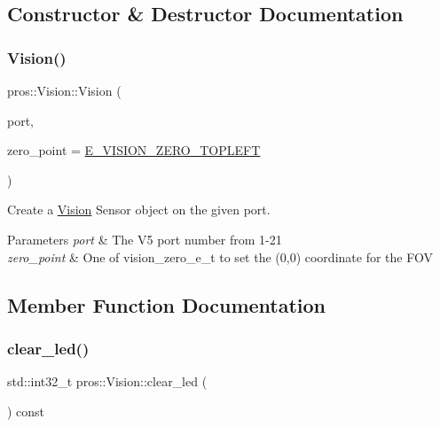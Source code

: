 \subsection{Constructor \& Destructor Documentation}
\mbox{\label{classpros_1_1Vision_a46cdaf74713f630b5bb5f4d0d3259dcd}} 
\subsubsection{\texorpdfstring{Vision()}{Vision()}}
{\footnotesize\ttfamily pros\+::\+Vision\+::\+Vision (\begin{DoxyParamCaption}\item[{std\+::uint8\+\_\+t}]{port,  }\item[{\mbox{\hyperlink{vision_8h_a2e8bc1c48f8aab12275bfc1868fbbad6}{vision\+\_\+zero\+\_\+e\+\_\+t}}}]{zero\+\_\+point = {\ttfamily \mbox{\hyperlink{vision_8h_aef7c8269b3fb0dfbf4e597b2d8dd7af5a0ff244c5f3e9771f962986e25b00ff3d}{E\+\_\+\+V\+I\+S\+I\+O\+N\+\_\+\+Z\+E\+R\+O\+\_\+\+T\+O\+P\+L\+E\+FT}}} }\end{DoxyParamCaption})}



Create a \mbox{\hyperlink{classpros_1_1Vision}{Vision}} Sensor object on the given port. 


\begin{DoxyParams}{Parameters}
{\em port} & The V5 port number from 1-\/21 \\
\hline
{\em zero\+\_\+point} & One of vision\+\_\+zero\+\_\+e\+\_\+t to set the (0,0) coordinate for the F\+OV \\
\hline
\end{DoxyParams}


\subsection{Member Function Documentation}
\mbox{\label{classpros_1_1Vision_a00f02cfb09ca224c2a7735be918e941d}} 
\subsubsection{\texorpdfstring{clear\_led()}{clear\_led()}}
{\footnotesize\ttfamily std\+::int32\+\_\+t pros\+::\+Vision\+::clear\+\_\+led (\begin{DoxyParamCaption}\item[{void}]{ }\end{DoxyParamCaption}) const}



